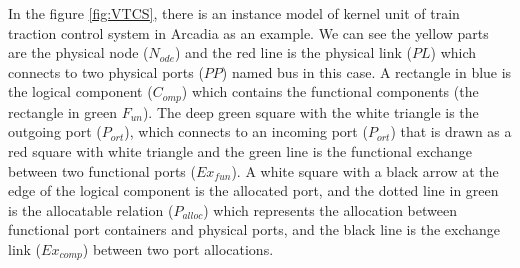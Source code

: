 In the figure \ref{fig:VTCS}, there is an instance model of kernel unit of train traction control system in Arcadia as an example. We can see the yellow parts are the physical node ($N_{ode}$) and the red line is the physical link ($PL$) which connects to two physical ports ($PP$) named bus in this case. A rectangle in blue is the logical component ($C_{omp}$) which contains the functional components (the rectangle in green $F_{un}$). The deep green square with the white triangle is the outgoing port ($P_{ort}$), which connects to an incoming port ($P_{ort}$) that is drawn as a red square with white triangle and the green line is the functional exchange between two functional ports ($Ex_{fun}$). A white square with a black arrow at the edge of the logical component is the allocated port, and the dotted line in green is the allocatable relation ($P_{alloc}$) which represents the allocation between functional port containers and physical ports, and the black line is the exchange link ($Ex_{comp}$) between two port allocations.
